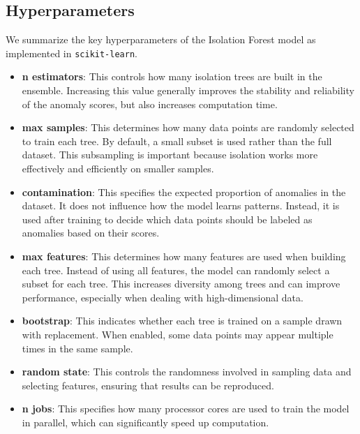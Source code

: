 \documentclass[10pt,a4paper]{article}
\begin{document}
		\subsection{Hyperparameters}
		
		We summarize the key hyperparameters of the Isolation Forest model as implemented in \texttt{scikit-learn}.
		
		\begin{itemize}
		
		\item \textbf{n estimators}: This controls how many isolation trees are built in the ensemble. Increasing this value generally improves the stability and reliability of the anomaly scores, but also increases computation time.
		
		\item \textbf{max samples}: This determines how many data points are randomly selected to train each tree. By default, a small subset is used rather than the full dataset. This subsampling is important because isolation works more effectively and efficiently on smaller samples.
		
		\item \textbf{contamination}: This specifies the expected proportion of anomalies in the dataset. It does not influence how the model learns patterns. Instead, it is used after training to decide which data points should be labeled as anomalies based on their scores.
		
		\item \textbf{max features}: This determines how many features are used when building each tree. Instead of using all features, the model can randomly select a subset for each tree. This increases diversity among trees and can improve performance, especially when dealing with high-dimensional data.
		
		\item \textbf{bootstrap}: This indicates whether each tree is trained on a sample drawn with replacement. When enabled, some data points may appear multiple times in the same sample.
		
		\item \textbf{random state}: This controls the randomness involved in sampling data and selecting features, ensuring that results can be reproduced.
		
		\item \textbf{n jobs}: This specifies how many processor cores are used to train the model in parallel, which can significantly speed up computation.
		
		\end{itemize}
	
\end{document}
